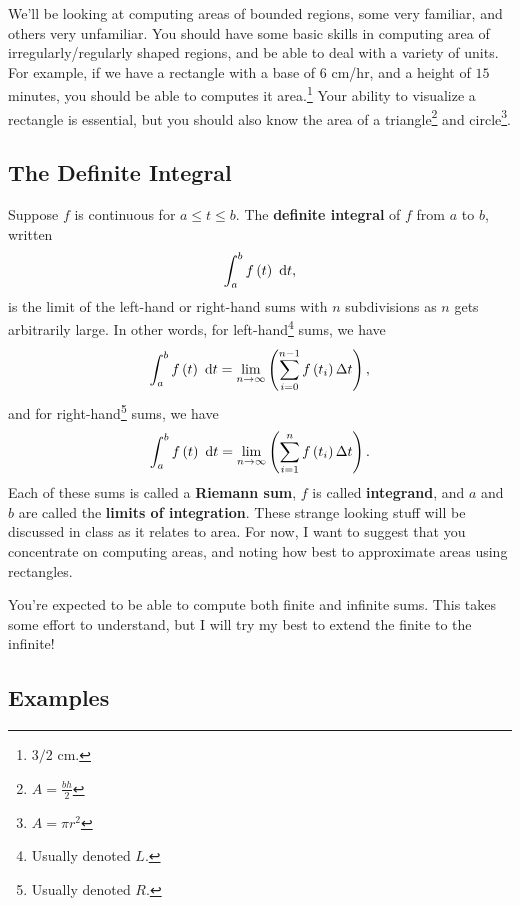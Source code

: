 \documentclass[12pt,addpoints, answers, fleqn]{exam}
\begin{document}
We'll be looking at computing areas of bounded regions, some very familiar, and others very unfamiliar. You should have some basic skills in computing area of irregularly/regularly shaped regions, and be able to deal with a variety of units. For example, if we have a rectangle with a base of $6$ cm/hr, and a height of $15$ minutes, you should be able to computes it area.\footnote{$3/2$ cm.} Your ability to visualize a rectangle is essential, but you should also know the area of a triangle\footnote{$A = \displaystyle \frac{bh}{2}$} and circle\footnote{$A = \pi r^2$}.

\subsection{The Definite Integral}

Suppose $f$ is continuous for $a \leq t \leq b$. The \textbf{definite integral} of $f$ from $a$ to $b$, written
\[
\int_a^b f \left( t \right) \ {\rm{d}}t,
\]
is the limit of the left-hand or right-hand sums with $n$ subdivisions as $n$ gets arbitrarily large. In other words, for left-hand\footnote{Usually denoted $L$.} sums, we have
\[
\int_a^b f \left( t \right) \ {\rm{d}}t =
\mathop {\lim }\limits_{n \to \infty } \left( \sum_{i=0}^{n-1} f \left( t_i \right) \Delta t \right),
\]
and for right-hand\footnote{Usually denoted $R$.} sums, we have
\[
\int_a^b f \left( t \right) \ {\rm{d}}t =
\mathop {\lim }\limits_{n \to \infty } \left( \sum_{i=1}^{n} f \left( t_i \right) \Delta t \right).
\]
Each of these sums is called a \textbf{Riemann sum}, $f$ is called \textbf{integrand}, and $a$ and $b$ are called the \textbf{limits of integration}. These strange looking stuff will be discussed in class as it relates to area. For now, I want to suggest that you concentrate on computing areas, and noting how best to approximate areas using rectangles.


You're expected to be able to compute both finite and infinite sums. This takes some effort to understand, but I will try my best to extend the finite to the infinite!

\subsection{Examples}
\end{document}
